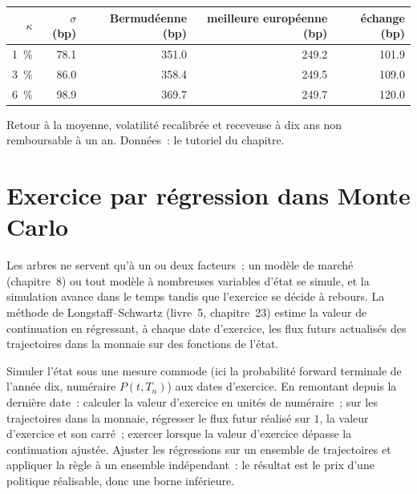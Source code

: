 \begin{center}
\small
\begin{tabular}{rrrrr}
\toprule
$\kappa$ & $\sigma$ (bp) & Bermudéenne (bp) & meilleure européenne (bp) & échange (bp) \\
\midrule
1~\% & 78.1 & 351.0 & 249.2 & 101.9 \\
3~\% & 86.0 & 358.4 & 249.5 & 109.0 \\
6~\% & 98.9 & 369.7 & 249.7 & 120.0 \\
\bottomrule
\end{tabular}

\footnotesize Retour à la moyenne, volatilité recalibrée et receveuse à dix ans non remboursable à un an.
Données~: le tutoriel du chapitre.
\end{center}

\section{Exercice par régression dans Monte Carlo}

Les arbres ne servent qu'à un ou deux facteurs~; un modèle de marché (chapitre~8) ou tout modèle
à nombreuses variables d'état se simule, et la simulation avance dans le temps tandis que l'exercice
se décide à rebours. La méthode de Longstaff--Schwartz (livre~5, chapitre~23)
estime la valeur de continuation en régressant, à chaque date d'exercice, les
flux futurs actualisés des trajectoires dans la monnaie sur des fonctions de l'état.

\begin{method}\label{met:rc:bermudans-and-callables:lsm}
Simuler l'état sous une mesure commode (ici la probabilité forward terminale
de l'année dix, numéraire $P(t,T_n)$) aux dates d'exercice. En remontant depuis la dernière date~:
calculer la valeur d'exercice en unités de numéraire~; sur les trajectoires dans la monnaie, régresser
le flux futur réalisé sur $1$, la valeur d'exercice et son carré~; exercer
lorsque la valeur d'exercice dépasse la continuation ajustée. Ajuster les régressions sur un
ensemble de trajectoires et appliquer la règle à un ensemble indépendant~: le résultat est le prix d'une
politique réalisable, donc une borne inférieure.
\end{method}

\label{lst:rc:bermudans-and-callables:lsm}

